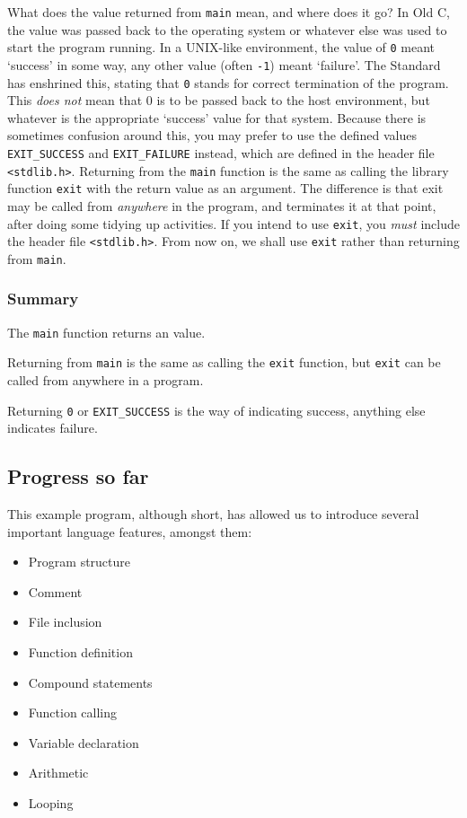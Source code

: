    What does the value returned from \texttt{main} mean, and where does
    it go? In Old C, the value was passed back to the operating system or
    whatever else was used to start the program running. In a UNIX-like
    environment, the value of \texttt{0} meant `success' in some way,
    any other value (often \texttt{-1}) meant `failure'. The Standard
    has enshrined this, stating that \texttt{0} stands for correct
    termination of the program. This \textit{does not} mean that 0 is to be
    passed back to the host environment, but whatever is the appropriate
    `success' value for that system. Because there is sometimes confusion
    around this, you may prefer to use the defined values
    \texttt{EXIT\_SUCCESS} and \texttt{EXIT\_FAILURE} instead, which are
    defined in the header file \texttt{<stdlib.h>}. Returning from
    the \texttt{main} function is the same as calling the library function
    \texttt{exit} with the return value as an argument. The difference is
    that exit may be called from \textit{anywhere} in the program, and
    terminates it at that point, after doing some tidying up activities. If you
    intend to use \texttt{exit}, you \textit{must} include the header file
    \texttt{<stdlib.h>}. From now on, we shall use \texttt{exit}
    rather than returning from \texttt{main}.


   \subsubsection{Summary}
    The \texttt{main} function returns an \kint{} value.

    Returning from \texttt{main} is the same as calling the
     \texttt{exit} function, but \texttt{exit} can be called from
     anywhere in a program.

    Returning \texttt{0} or \texttt{EXIT\_SUCCESS} is the way of
     indicating success, anything else indicates failure.

   

  

  \subsection{Progress so far}
   

   This example program, although short, has allowed us to introduce several
    important language features, amongst them:


   \begin{itemize}
    \item Program structure
    \item Comment
    \item File inclusion
    \item Function definition
    \item Compound statements
    \item Function calling
    \item Variable declaration
    \item Arithmetic
    \item Looping
   \end{itemize}

